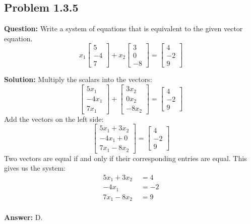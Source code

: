 \documentclass[11pt]{article}
\begin{document}
\subsection*{Problem 1.3.5}
\textbf{Question:} Write a system of equations that is equivalent to the given vector equation.
\[ x_1 \begin{bmatrix} 5 \\ -4 \\ 7 \end{bmatrix} + x_2 \begin{bmatrix} 3 \\ 0 \\ -8 \end{bmatrix} = \begin{bmatrix} 4 \\ -2 \\ 9 \end{bmatrix} \]

\textbf{Solution:}
Multiply the scalars into the vectors:
\[ \begin{bmatrix} 5x_1 \\ -4x_1 \\ 7x_1 \end{bmatrix} + \begin{bmatrix} 3x_2 \\ 0x_2 \\ -8x_2 \end{bmatrix} = \begin{bmatrix} 4 \\ -2 \\ 9 \end{bmatrix} \]
Add the vectors on the left side:
\[ \begin{bmatrix} 5x_1 + 3x_2 \\ -4x_1 + 0 \\ 7x_1 - 8x_2 \end{bmatrix} = \begin{bmatrix} 4 \\ -2 \\ 9 \end{bmatrix} \]
Two vectors are equal if and only if their corresponding entries are equal. This gives us the system:
\begin{align*}
    5x_1 + 3x_2 &= 4 \\
    -4x_1 \phantom{+ 0x_2} &= -2 \\
    7x_1 - 8x_2 &= 9
\end{align*}
\\
\textbf{Answer:} D.
\end{document}
